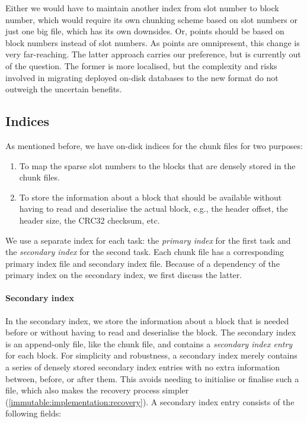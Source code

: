 Either we would have to maintain another index from slot number to block number,
which would require its own chunking scheme based on slot numbers or just one
big file, which has its own downsides. Or, points should be based on block
numbers instead of slot numbers. As points are omnipresent, this change is very
far-reaching. The latter approach carries our preference, but is currently out
of the question. The former is more localised, but the complexity and risks
involved in migrating deployed on-disk databases to the new format do not
outweigh the uncertain benefits.

\subsection{Indices}
\label{immutable:implementation:indices}

As mentioned before, we have on-disk indices for the chunk files for two
purposes:
\begin{enumerate}
\item To map the sparse slot numbers to the blocks that are densely stored in
  the chunk files.
\item To store the information about a block that should be available without
  having to read and deserialise the actual block, e.g., the header offset, the
  header size, the CRC32 checksum, etc.
\end{enumerate}
We use a separate index for each task: the \emph{primary index} for the first
task and the \emph{secondary index} for the second task. Each chunk file has a
corresponding primary index file and secondary index file. Because of a
dependency of the primary index on the secondary index, we first discuss the
latter.

\paragraph{Secondary index}

In the secondary index, we store the information about a block that is needed
before or without having to read and deserialise the block. The secondary index
is an append-only file, like the chunk file, and contains a \emph{secondary
index entry} for each block. For simplicity and robustness, a secondary index
merely contains a series of densely stored secondary index entries with no extra
information between, before, or after them. This avoids needing to initialise or
finalise such a file, which also makes the recovery process simpler
(\cref{immutable:implementation:recovery}). A secondary index entry consists of
the following fields:


